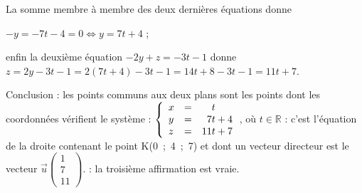 \documentclass[10pt]{article}
\providecommand{\R}{\mathbb{R}}
\providecommand{\vect}[1]{\overrightarrow{#1}}
\begin{document}
\begin{enumerate}
\begin{enumerate}
La somme membre à membre des deux dernières équations donne

$-y =- 7t - 4 = 0 \iff y = 7t + 4 $ ;

enfin la deuxième équation $-2y + z = - 3t - 1$ donne $z = 2y - 3t - 1 = 2(7t + 4) - 3t - 1 = 14t + 8 - 3t - 1 = 11t + 7$.
		\end{enumerate}


Conclusion : les points communs aux deux plans sont les points dont les coordonnées vérifient le système : $\left\{\begin{array}{l c l}
x&=& \phantom{17}t\\
y& =& \phantom{1}7t + 4 \\
z& =& 11t + 7
\end{array}\right.$, où $t \in \R$ : c'est l'équation de la droite contenant le point K(0~;~4~;~7) et dont un vecteur directeur est le vecteur $\vect{u}\begin{pmatrix} 1\\7\\11\end{pmatrix}$. : la troisième affirmation est vraie.
\end{enumerate}

\vspace{0,5cm}
\end{document}
